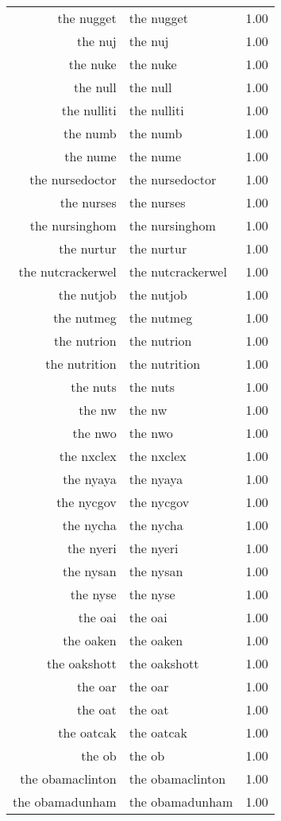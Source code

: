 \begin{table}[ht]
\begin{tabular}{rlr}
  the nugget & the nugget & 1.00 \\ 
  the nuj & the nuj & 1.00 \\ 
  the nuke & the nuke & 1.00 \\ 
  the null & the null & 1.00 \\ 
  the nulliti & the nulliti & 1.00 \\ 
  the numb & the numb & 1.00 \\ 
  the nume & the nume & 1.00 \\ 
  the nursedoctor & the nursedoctor & 1.00 \\ 
  the nurses & the nurses & 1.00 \\ 
  the nursinghom & the nursinghom & 1.00 \\ 
  the nurtur & the nurtur & 1.00 \\ 
  the nutcrackerwel & the nutcrackerwel & 1.00 \\ 
  the nutjob & the nutjob & 1.00 \\ 
  the nutmeg & the nutmeg & 1.00 \\ 
  the nutrion & the nutrion & 1.00 \\ 
  the nutrition & the nutrition & 1.00 \\ 
  the nuts & the nuts & 1.00 \\ 
  the nw & the nw & 1.00 \\ 
  the nwo & the nwo & 1.00 \\ 
  the nxclex & the nxclex & 1.00 \\ 
  the nyaya & the nyaya & 1.00 \\ 
  the nycgov & the nycgov & 1.00 \\ 
  the nycha & the nycha & 1.00 \\ 
  the nyeri & the nyeri & 1.00 \\ 
  the nysan & the nysan & 1.00 \\ 
  the nyse & the nyse & 1.00 \\ 
  the oai & the oai & 1.00 \\ 
  the oaken & the oaken & 1.00 \\ 
  the oakshott & the oakshott & 1.00 \\ 
  the oar & the oar & 1.00 \\ 
  the oat & the oat & 1.00 \\ 
  the oatcak & the oatcak & 1.00 \\ 
  the ob & the ob & 1.00 \\ 
  the obamaclinton & the obamaclinton & 1.00 \\ 
  the obamadunham & the obamadunham & 1.00 \\ 

\end{tabular}
\end{table}
